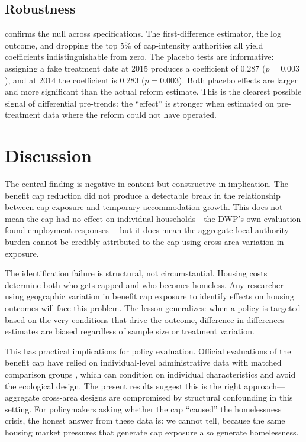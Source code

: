 \documentclass[12pt]{article}
\begin{document}
\subsection{Robustness}



 confirms the null across specifications. The first-difference estimator, the log outcome, and dropping the top 5\% of cap-intensity authorities all yield coefficients indistinguishable from zero. The placebo tests are informative: assigning a fake treatment date at 2015 produces a coefficient of 0.287 ($p = 0.003$), and at 2014 the coefficient is 0.283 ($p = 0.003$). Both placebo effects are larger and more significant than the actual reform estimate. This is the clearest possible signal of differential pre-trends: the ``effect'' is stronger when estimated on pre-treatment data where the reform could not have operated.

\section{Discussion}
\label{sec:discussion}

The central finding is negative in content but constructive in implication. The benefit cap reduction did not produce a detectable break in the relationship between cap exposure and temporary accommodation growth. This does not mean the cap had no effect on individual households---the DWP's own evaluation found employment responses \citep{dwp2019lowerbenefit}---but it does mean the aggregate local authority burden cannot be credibly attributed to the cap using cross-area variation in exposure.

The identification failure is structural, not circumstantial. Housing costs determine both who gets capped and who becomes homeless. Any researcher using geographic variation in benefit cap exposure to identify effects on housing outcomes will face this problem. The lesson generalizes: when a policy is targeted based on the very conditions that drive the outcome, difference-in-differences estimates are biased regardless of sample size or treatment variation.

This has practical implications for policy evaluation. Official evaluations of the benefit cap have relied on individual-level administrative data with matched comparison groups \citep{dwp2019lowerbenefit}, which can condition on individual characteristics and avoid the ecological design. The present results suggest this is the right approach---aggregate cross-area designs are compromised by structural confounding in this setting. For policymakers asking whether the cap ``caused'' the homelessness crisis, the honest answer from these data is: we cannot tell, because the same housing market pressures that generate cap exposure also generate homelessness.
\end{document}

